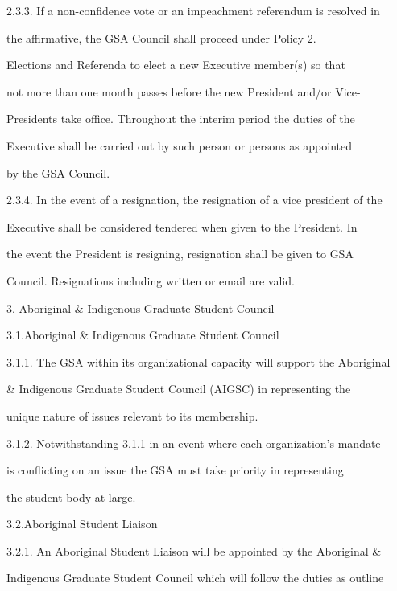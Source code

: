 \documentclass{article}
\begin{document}
2.3.3. If a non-confidence vote or an impeachment referendum is resolved in  

the  affirmative,  the  GSA  Council  shall  proceed  under  Policy  2.  

Elections  and Referenda  to  elect  a  new  Executive  member(s)  so that  

not more than one month passes before the new President and/or Vice- 

Presidents take office. Throughout the interim period the duties of the  

Executive shall be carried out by such person or persons as appointed  

by the GSA Council.  



2.3.4. In the event of a resignation, the resignation of a vice president of the  

Executive shall be considered tendered when given to the President. In  

the event the President is resigning, resignation shall be given to GSA  

Council. Resignations including written or email are valid.  



3.  Aboriginal \& Indigenous Graduate Student Council  



3.1.Aboriginal \& Indigenous Graduate Student Council  



3.1.1. The GSA within its organizational capacity will support the Aboriginal  

\& Indigenous Graduate Student Council (AIGSC) in representing the  

unique nature of issues relevant to its membership.  



3.1.2. Notwithstanding 3.1.1 in an event where each organization’s mandate  

is conflicting on an issue the GSA must take priority in representing  

the student body at large.  



3.2.Aboriginal Student Liaison  



3.2.1. An Aboriginal Student Liaison will be appointed by the Aboriginal \&  

Indigenous Graduate Student Council which will follow the duties as outline  
\end{document}
